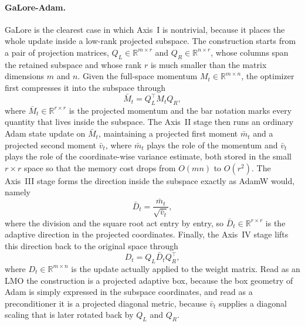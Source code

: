 \paragraph{GaLore-Adam.}
GaLore is the clearest case in which Axis~I is nontrivial, because it places the whole update inside a low-rank projected subspace. The construction starts from a pair of projection matrices, $Q_L\in\mathbb{R}^{m\times r}$ and $Q_R\in\mathbb{R}^{n\times r}$, whose columns span the retained subspace and whose rank $r$ is much smaller than the matrix dimensions $m$ and $n$. Given the full-space momentum $M_t\in\mathbb{R}^{m\times n}$, the optimizer first compresses it into the subspace through
\begin{equation}
  \bar{M}_t=Q_L^\top M_t Q_R,
\end{equation}
where $\bar{M}_t\in\mathbb{R}^{r\times r}$ is the projected momentum and the bar notation marks every quantity that lives inside the subspace. The Axis~II stage then runs an ordinary Adam state update on $\bar{M}_t$, maintaining a projected first moment $\bar{m}_t$ and a projected second moment $\bar{v}_t$, where $\bar{m}_t$ plays the role of the momentum and $\bar{v}_t$ plays the role of the coordinate-wise variance estimate, both stored in the small $r\times r$ space so that the memory cost drops from $O(mn)$ to $O(r^2)$. The Axis~III stage forms the direction inside the subspace exactly as AdamW would, namely
\begin{equation}
  \bar{D}_t=\frac{\bar{m}_t}{\sqrt{\bar{v}_t}},
\end{equation}
where the division and the square root act entry by entry, so $\bar{D}_t\in\mathbb{R}^{r\times r}$ is the adaptive direction in the projected coordinates. Finally, the Axis~IV stage lifts this direction back to the original space through
\begin{equation}
  D_t=Q_L\bar{D}_t Q_R^\top,
\end{equation}
where $D_t\in\mathbb{R}^{m\times n}$ is the update actually applied to the weight matrix. Read as an LMO the construction is a projected adaptive box, because the box geometry of Adam is simply expressed in the subspace coordinates, and read as a preconditioner it is a projected diagonal metric, because $\bar{v}_t$ supplies a diagonal scaling that is later rotated back by $Q_L$ and $Q_R$.


